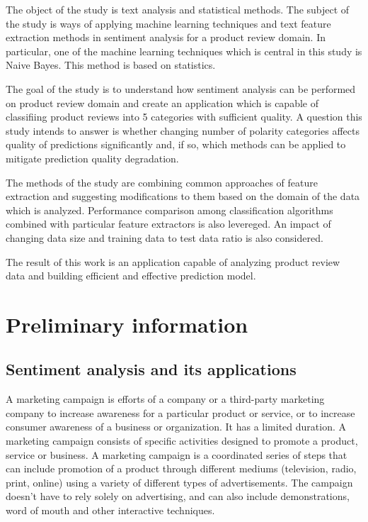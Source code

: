 \documentclass[12pt]{report}
\begin{document}
The object of the study is text analysis and statistical methods. The subject of the study is ways of applying machine learning techniques and text feature extraction methods in sentiment analysis for a product review domain. In particular, one of the machine learning techniques which is central in this study is Naive Bayes. This method is based on statistics.

The goal of the study is to understand how sentiment analysis can be performed on product review domain and create an application which is capable of classifiing product reviews into 5 categories with sufficient quality. A question this study intends to answer is whether changing number of polarity categories affects quality of predictions significantly and, if so, which methods can be applied to mitigate prediction quality degradation.

The methods of the study are combining common approaches of feature extraction and suggesting modifications to them based on the domain of the data which is analyzed. Performance comparison among classification algorithms combined with particular feature extractors is also levereged. An impact of changing data size and training data to test data ratio is also considered.

The result of this work is an application capable of analyzing product review data and building efficient and effective prediction model.

\newpage

\chapter{Preliminary information}

\section{Sentiment analysis and its applications}

A marketing campaign is efforts of a company or a third-party marketing company to increase awareness for a particular product or service, or to increase consumer awareness of a business or organization. It has a limited duration. A marketing campaign consists of specific activities designed to promote a product, service or business. A marketing campaign is a coordinated series of steps that can include promotion of a product through different mediums (television, radio, print, online) using a variety of different types of advertisements. The campaign doesn't have to rely solely on advertising, and can also include demonstrations, word of mouth and other interactive techniques.
\end{document}
